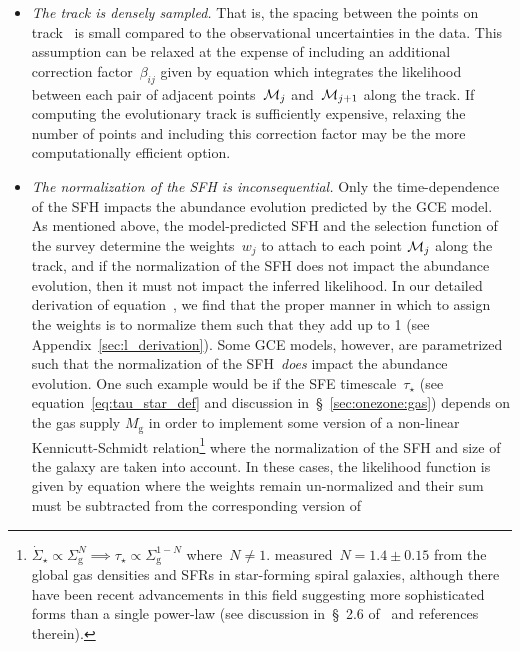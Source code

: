 \documentclass[ms.tex]{subfiles}
\begin{document}
\begin{itemize}
\begin{itemize}
		\item \textit{The track is densely sampled.}
		That is, the spacing between the points on track~ is small
		compared to the observational uncertainties in the data.
		This assumption can be relaxed at the expense of including an
		additional correction factor~$\beta_{ij}$ given by equation
		 which integrates the likelihood between each
		pair of adjacent points~$\mathcal{M}_j$ and~$\mathcal{M}_{j + 1}$ along
		the track.
		If computing the evolutionary track is sufficiently expensive,
		relaxing the number of points and including this correction factor may
		be the more computationally efficient option.

		\item \textit{The normalization of the SFH is inconsequential.}
		Only the time-dependence of the SFH impacts the abundance evolution
		predicted by the GCE model.
		As mentioned above, the model-predicted SFH and the selection function
		of the survey determine the weights~$w_j$ to attach to each point
		$\mathcal{M}_j$ along the track, and if the normalization of the SFH
		does not impact the abundance evolution, then it must not impact the
		inferred likelihood.
		In our detailed derivation of equation~, we find
		that the proper manner in which to assign the weights is to normalize
		them such that they add up to 1 (see Appendix~\ref{sec:l_derivation}).
		Some GCE models, however, are parametrized such that the normalization
		of the SFH~\textit{does} impact the abundance evolution.
		One such example would be if the SFE
		timescale~$\tau_\star$ (see equation~\ref{eq:tau_star_def} and
		discussion in~\S~\ref{sec:onezone:gas}) depends on the gas supply
		$M_\text{g}$ in order to implement some version of a non-linear
		Kennicutt-Schmidt relation\footnote{
			$\dot{\Sigma}_\star \propto \Sigma_\text{g}^N \implies \tau_\star
			\propto \Sigma_\text{g}^{1 - N}$ where~$N \neq 1$.
			\citet{kennicutt1998} measured~$N = 1.4 \pm 0.15$ from the global
			gas densities and SFRs in star-forming spiral galaxies, although
			there have been recent advancements in this field suggesting more
			sophisticated forms than a single power-law (see discussion
			in~\S~2.6 of~\citealt{Johnson2021} and references therein).
		} where the normalization of the SFH and size of the galaxy are taken
		into account.
		In these cases, the likelihood function is given by equation
		 where the weights remain un-normalized and
		their sum must be subtracted from the corresponding version of

\end{itemize}
\end{itemize}
\end{document}
